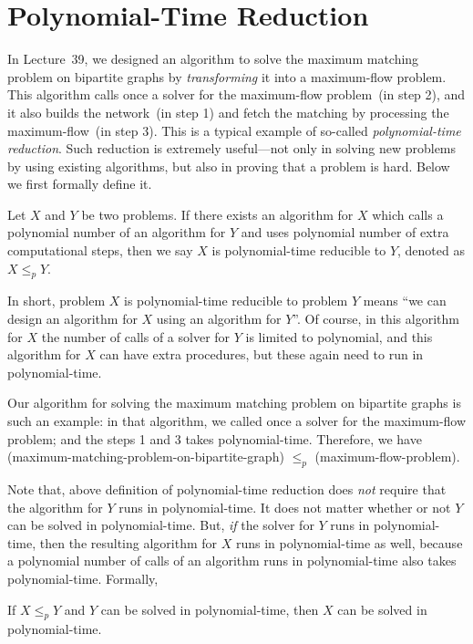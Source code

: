 \setcounter{definition}{0} \setcounter{property}{0} \setcounter{claim}{0} \setcounter{fact}{0} \setcounter{corollary}{0} \setcounter{figure}{0}
\section{Polynomial-Time Reduction}


In Lecture~39, we designed an algorithm to solve the maximum matching problem on bipartite graphs
by \emph{transforming} it into a maximum-flow problem. This algorithm calls once a
solver for the maximum-flow problem~(in step 2), and it also builds the network~(in step 1)
and fetch the matching by processing the maximum-flow~(in step 3). This is a typical
example of so-called \emph{polynomial-time reduction}.
Such {reduction} is extremely useful---not only in solving new problems by using existing algorithms,
but also in proving that a problem is hard. Below we first formally define it.

\begin{definition}
Let $X$ and $Y$ be two problems.
If there exists an algorithm for $X$ which
calls a polynomial number of an algorithm for $Y$
and uses polynomial number of extra computational steps,
then we say $X$ is polynomial-time reducible to $Y$, denoted as $X \le_p Y$.
\end{definition}

In short, problem $X$ is polynomial-time reducible to problem $Y$ means ``we can design an algorithm for $X$ using an algorithm for $Y$''.
Of course, in this algorithm for $X$ the number of calls of a solver for $Y$ is limited to polynomial, and this algorithm for $X$
can have extra procedures, but these again need to run in polynomial-time.

Our algorithm for solving the maximum matching problem on bipartite graphs is such an example:
in that algorithm, we called once a solver for the maximum-flow problem; and the steps 1 and 3
takes polynomial-time. Therefore, we have (maximum-matching-problem-on-bipartite-graph) $\le_p$ (maximum-flow-problem).

Note that, above definition of polynomial-time reduction does \emph{not} require that
the algorithm for $Y$ runs in polynomial-time. It does not matter whether or not $Y$ can
be solved in polynomial-time. But, \emph{if} the solver for $Y$ runs in polynomial-time,
then the resulting algorithm for $X$ runs in polynomial-time as well, because 
a polynomial number of calls of an algorithm runs in polynomial-time also takes polynomial-time.
Formally,
\begin{fact}
If $X\le_p Y$ and $Y$ can be solved in polynomial-time, then $X$ can be solved in polynomial-time.
\end{fact}

